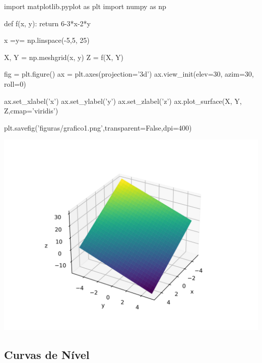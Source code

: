 \begin{frame}[label=funcoes,fragile=singleslide]
\begin{pycode}
import matplotlib.pyplot as plt
import numpy as np

def f(x, y):
    return 6-3*x-2*y

x =y= np.linspace(-5,5, 25)

X, Y = np.meshgrid(x, y)
Z = f(X, Y)

fig = plt.figure()
ax = plt.axes(projection='3d')
ax.view_init(elev=30, azim=30, roll=0)

ax.set_xlabel('x')
ax.set_ylabel('y')
ax.set_zlabel('z')
ax.plot_surface(X, Y, Z,cmap='viridis')


plt.savefig('figuras/grafico1.png',transparent=False,dpi=400)
\end{pycode}

\begin{center}
\includegraphics[scale=0.7]{figuras/grafico1.png}
\end{center}
\end{frame}


\subsection*{Curvas de Nível}

